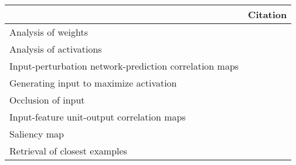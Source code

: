 \begin{tabular}{ll}
\toprule
{} &                                                                                                                                                                                          Citation \\
\midrule
Analysis of weights                                    &  \cite{Perez-Benitez2018, Yoon2018, Langkvist2018, Deiss2018, Lawhern2018, Xu2016, Tsinalis2016a, Nurse2016, Tabar2016a, Zheng2015, Stober2015, Manor2015, Yang2015a, Langkvist2012, Cecotti2011} \\
Analysis of activations                                &                                                                                           \cite{Yuan2018a, Waytowich2018, Lawhern2018, kwak2017, Yin2017a, Supratak2017, Shamwell2016, Manor2015} \\
Input-perturbation network-prediction correlation maps &                                                                                                              \cite{Schirrmeister2017a, Volker2018, Hartmann2018b, Behncke2017, Schirrmeister2017} \\
Generating input to maximize activation                &                                                                                                                                      \cite{VanPutten2018b, Ruffini2018a, Sors2018, Bashivan2016a} \\
Occlusion of input                                     &                                                                                                                                                        \cite{Lee2018, Chambon2018, Thodoroff2016} \\
Input-feature unit-output correlation maps             &                                                                                                                                                                          \cite{Schirrmeister2017} \\
Saliency map                                           &                                                                                                                                                                               \cite{Vilamala2017} \\
Retrieval of closest examples                          &                                                                                                                                                                                  \cite{Deiss2018} \\

\end{tabular}
